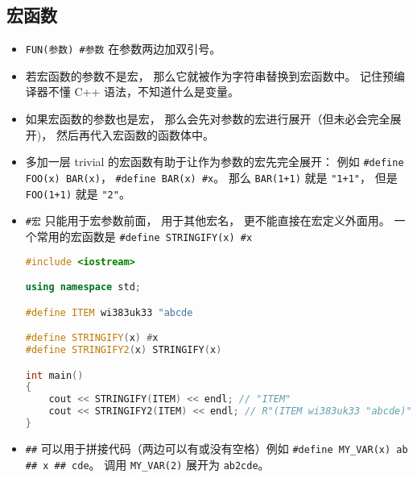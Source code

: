 \subsection{宏函数}
\begin{itemize}
\item \verb`FUN(参数) #参数` 在参数两边加双引号。
\item 若宏函数的参数不是宏， 那么它就被作为字符串替换到宏函数中。 记住预编译器不懂 C++ 语法，不知道什么是变量。
\item 如果宏函数的参数也是宏， 那么会先对参数的宏进行展开（但未必会完全展开)， 然后再代入宏函数的函数体中。
\item 多加一层 trivial 的宏函数有助于让作为参数的宏先完全展开： 例如 \verb`#define FOO(x) BAR(x)`， \verb`#define BAR(x) #x`。 那么 \verb`BAR(1+1)` 就是 \verb`"1+1"`， 但是 \verb`FOO(1+1)` 就是 \verb`"2"`。
\item \verb`#宏` 只能用于宏参数前面， 用于其他宏名， 更不能直接在宏定义外面用。 一个常用的宏函数是 \verb`#define STRINGIFY(x) #x`
\begin{lstlisting}[language=cpp]
#include <iostream>

using namespace std;

#define ITEM wi383uk33 "abcde

#define STRINGIFY(x) #x
#define STRINGIFY2(x) STRINGIFY(x)

int main()
{
	cout << STRINGIFY(ITEM) << endl; // "ITEM"
	cout << STRINGIFY2(ITEM) << endl; // R"(ITEM wi383uk33 "abcde)"
}
\end{lstlisting}
\item \verb`##` 可以用于拼接代码（两边可以有或没有空格）例如 \verb`#define MY_VAR(x) ab ## x ## cde`。 调用 \verb`MY_VAR(2)` 展开为 \verb`ab2cde`。
\end{itemize}

